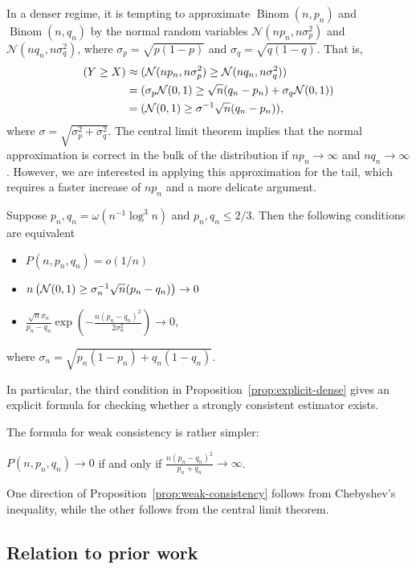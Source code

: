 \documentclass[EJP]{ejpecp}
\newcommand{\1}[1]{\mathbbm{1}_{\{#1\}}}
\newcommand{\normal}{\mathcal{N}}
\let\Pr\relax
\DeclareMathOperator{\Pr}{Pr}
\DeclareMathOperator{\Binom}{Binom}
\begin{document}
In a denser regime, it is tempting to approximate $\Binom(n,p_n)$ and $\Binom(n,q_n)$ by the normal random variables
$\normal(n p_n, n \sigma_p^2)$ and $\normal(n q_n, n \sigma_q^2)$, where
$\sigma_p = \sqrt{p(1-p)}$ and $\sigma_q = \sqrt{q(1-q)}$. That is,
\begin{align*}
\Pr(Y \geq X) &\approx \Pr(\normal(n p_n, n \sigma_p^2) \geq \normal(n q_n, n \sigma_q^2)) \\
&= \Pr(\sigma_p \normal(0,1) \geq \sqrt{n}(q_n - p_n) + \sigma_q \normal(0,1)) \\ &=
\Pr(\normal(0,1) \geq \sigma^{-1} \sqrt{n}(q_n - p_n)),
\end{align*}
where $\sigma = \sqrt{\sigma_p^2 + \sigma_q^2}$. The central limit theorem implies that
the normal approximation is correct in the bulk of the distribution if $np_n \to \infty$ and
$n q_n \to \infty$. However, we are interested in applying this approximation for the tail,
which requires a faster increase of $n p_n$ and a more delicate argument.

\begin{proposition}\label{prop:explicit-dense}
Suppose
$
p_n,q_n = \omega\left( n^{-1} \log^3 n \right)$
and $p_n, q_n \leq 2/3.$
Then the following conditions are equivalent
\begin{itemize}
\item
$P(n, p_n, q_n) = o(1/n)$
\item
$n \Pr\left(\normal(0,1) \geq \sigma_n^{-1} \sqrt{n}(p_n - q_n)\right) \to 0$
\item
$\frac{\sqrt{n} \sigma_n}{p_n-q_n} \exp(-\frac{n (p_n - q_n)^2}{2 \sigma_n^2}) \to 0$,
\end{itemize}
where $\sigma_n = \sqrt{p_n(1-p_n) + q_n(1-q_n)}$.
\end{proposition}
In particular, the third condition in Proposition~\ref{prop:explicit-dense} 
gives an explicit formula for checking whether a strongly consistent estimator
exists.

The formula for weak consistency is rather simpler:
\begin{proposition}\label{prop:weak-consistency}
 $P(n, p_n, q_n) \to 0$ if and only if
 $\frac{n(p_n - q_n)^2}{p_n + q_n} \to \infty$.
\end{proposition}
One direction of Proposition~\ref{prop:weak-consistency} follows from Chebyshev's inequality,
while the other follows from the central limit theorem.

\subsection{Relation to prior work}
\end{document}
